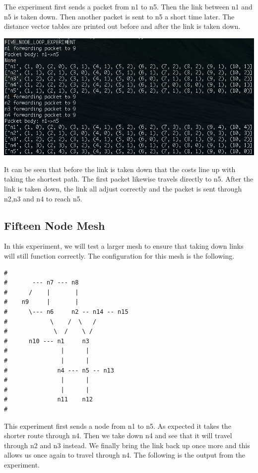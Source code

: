 \documentclass[11pt]{article}
\begin{document}
The experiment first sends a packet from n1 to n5. Then the link between n1 and n5 is taken down. Then another packet is sent to n5 a short time later. The distance vector tables are printed out before and after the link is taken down.

\centerline{\includegraphics[width=16cm]{five_node_loop.png}}

It can be seen that before the link is taken down that the costs line up with taking the shortest path. The first packet likewise travels directly to n5. After the link is taken down, the link all adjust correctly and the packet is sent through n2,n3 and n4 to reach n5. 

\subsection{Fifteen Node Mesh}

In this experiment, we will test a larger mesh to ensure that taking down links will still function correctly. The configuration for this mesh is the following.

\begin{lstlisting}
#
#       --- n7 --- n8
#      /    |       |
#    n9     |       |
#      \--- n6     n2 -- n14 -- n15
#            \    /  \   /
#             \  /    \ /
#      n10 --- n1     n3
#               |      |
#               |      |
#              n4 --- n5 -- n13
#               |      |
#               |      |
#              n11    n12
#
\end{lstlisting}

This experiment first sends a node from n1 to n5. As expected it takes the shorter route through n4. Then we take down n4 and see that it will travel through n2 and n3 instead. We finally bring the link back up once more and this allows us once again to travel through n4. The following is the output from the experiment.
\end{document}
